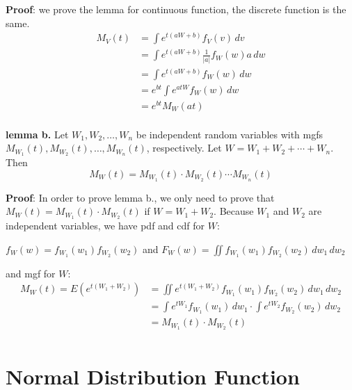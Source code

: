 \documentclass[11pt]{article}
\begin{document}
\textbf{Proof}:  we prove the lemma for continuous function,  the discrete function is the same.
$$
\begin{aligned}
M_V (t)
	&= \int e^{t (aW +b)} f_V (v) \, dv \\
	&= \int e^{t (aW +b)} \frac{1}{|a|} f_W (w) a \, dw \\
	&= \int e^{t (aW +b)} f_W (w)  \, dw \\
	&= e^{bt} \int e^{atW} f_W (w)  \, dw \\
	&= e^{bt} M_W (at) \\
\end{aligned}
$$

\begin{tcolorbox}[
	enhanced, 
	width=\textwidth, 
	fontupper=\normalsize,%
	drop fuzzy shadow southwest,
	boxrule=0.4pt,
	sharp corners,
	colframe=yellow!80!black,
	colback=yellow!10]
	
\textbf{\color{RoyalBlue} lemma b.}  Let $W_1, W_2,  \dots , W_n$ be independent random variables with mgfs $M_{W_1} (t),  M_{W_2} (t),  \dots,  M_{W_n} (t)$,  respectively.  Let $W = W_1 + W_2 + \cdots + W_n$.  Then
$$
M_W (t) = M_{W_1} (t) \cdot M_{W_2} (t) \cdots M_{W_n} (t)
$$

\end{tcolorbox}

\textbf{Proof}: In order to prove lemma b.,  we only need to prove that $ M_W(t) = M_{W_1} (t) \cdot M_{W_2} (t)$ if  $W = W_1 + W_2 $.  Because $W_1$ and $W_2$ are independent variables,  we have pdf and cdf for $W$: 
\begin{center}
$f_W (w) = f_{W_1} (w_1) f_{W_2} (w_2) $ \hspace{15pt}  and  \hspace{15pt} $F_W(w) = \displaystyle \iint  f_{W_1} (w_1) f_{W_2} (w_2) \, dw_1 \,dw_2 $
\end{center}
and mgf for $W$: 
$$
\begin{aligned}
M_W (t) = E(e^{t(W_1 + W_2)}) 
	&= \iint e^{t(W_1 + W_2)}  f_{W_1} (w_1) f_{W_2} (w_2) \, dw_1 \,dw_2 \\
	&= \int e^{tW_1}  f_{W_1} (w_1) \, dw_1 \cdot \int e^{tW_2}  f_{W_2} (w_2) \, dw_2 \\ 
	&= M_{W_1} (t) \cdot M_{W_2} (t) \\
\end{aligned}
$$



\section {\large Normal Distribution Function}
\end{document}
